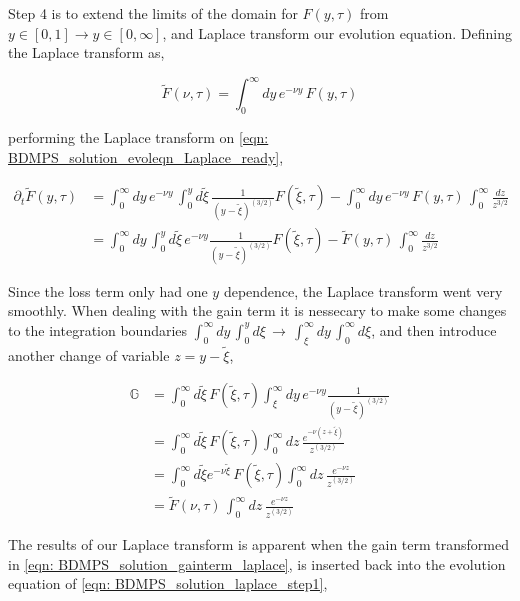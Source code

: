 \documentclass[main.tex]{subfiles}
\begin{document}
Step 4 is to extend the limits of the domain for \(F(y,\tau)\) from \(y\in[0,1] \rightarrow y \in [0, \infty]\), and Laplace transform our evolution equation. Defining the Laplace transform as, 

\begin{equation}\label{eqn: BDMPS_solution_Laplace_definition}
    \tilde{F}(\nu, \tau) = \int_0^\infty dy \, e^{-\nu y}\, F(y,\tau)
\end{equation}

performing the Laplace transform on \autoref{eqn: BDMPS_solution_evoleqn_Laplace_ready},

\begin{align}\label{eqn: BDMPS_solution_laplace_step1}
    \partial_t \tilde{F}(y,\tau) &= \int_0^\infty dy\, e^{-\nu y}\,  \int_0^{y} d\tilde{\xi} \, \frac{1}{(y-\tilde{\xi})^{(3/2)}} F(\tilde{\xi}, \tau) - \int_0^\infty dy \, e^{-\nu y}\, F(y,\tau) \, \int_0^\infty \frac{dz}{z^{3/2}} \nonumber \\
    &= \int_0^\infty dy\, \int_0^{y} d\tilde{\xi} \, e^{-\nu y} \frac{1}{(y-\tilde{\xi})^{(3/2)}} F(\tilde{\xi}, \tau) - \tilde{F}(y,\tau) \, \int_0^\infty \frac{dz}{z^{3/2}}
\end{align}

Since the loss term only had one \(y\) dependence, the Laplace transform went very smoothly. When dealing with the gain term it is nessecary to make some changes to the integration boundaries \(\int_0^\infty dy\, \int_0^y d\xi \,\rightarrow\, \int_\xi^\infty dy\, \int_0^\infty d\xi\), and then introduce another change of variable \(z = y-\tilde{\xi}\),

\begin{align}\label{eqn: BDMPS_solution_gainterm_laplace}
    \mathbb{G} &= \int_0^{\infty} d\tilde{\xi} \,F(\tilde{\xi}, \tau) \int_\xi^\infty dy\,  e^{-\nu y} \frac{1}{(y-\tilde{\xi})^{(3/2)}} \nonumber \\
    &= \int_0^{\infty} d\tilde{\xi} \,F(\tilde{\xi}, \tau) \int_0^\infty dz\, \frac{e^{-\nu (z+\tilde{\xi})}}{z^{(3/2)}} \nonumber \\
    &= \int_0^{\infty} d\tilde{\xi} e^{-\nu \tilde{\xi}} \,F(\tilde{\xi}, \tau) \int_0^\infty dz\, \frac{e^{-\nu z}}{z^{(3/2)}} \nonumber \\
    &= \tilde{F}(\nu, \tau) \, \int_0^\infty dz\, \frac{e^{-\nu z}}{z^{(3/2)}} 
\end{align}

The results of our Laplace transform is apparent when the gain term transformed in \autoref{eqn: BDMPS_solution_gainterm_laplace}, is inserted back into the evolution equation of \autoref{eqn: BDMPS_solution_laplace_step1}, 
\end{document}

